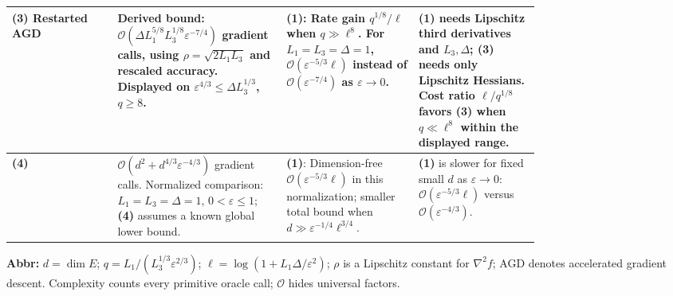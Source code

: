 \begin{table}[tp]
\begin{threeparttable}
\begin{tabularx}{\linewidth}{@{}>{\raggedright\arraybackslash}p{0.20\linewidth}>{\raggedright\arraybackslash}p{0.32\linewidth}>{\raggedright\arraybackslash}p{0.25\linewidth}>{\raggedright\arraybackslash}X@{}}
\midrule
\textbf{(3)} Restarted AGD \citep[Theorem 1]{gtoLiLin2023}
& Derived bound: $\mathcal{O}(\Delta L_1^{5/8}L_3^{1/8}\varepsilon^{-7/4})$ gradient calls, using $\rho=\sqrt{2L_1L_3}$ and rescaled accuracy. Displayed on $\varepsilon^{4/3}\leq\Delta L_3^{1/3}$, $q\geq8$.
& \textbf{(1)}: Rate gain $q^{1/8}/\ell$ when $q\gg\ell^8$. For $L_1=L_3=\Delta=1$, $\mathcal{O}(\varepsilon^{-5/3}\ell)$ instead of $\mathcal{O}(\varepsilon^{-7/4})$ as $\varepsilon\to0$.
& \textbf{(1)} needs Lipschitz third derivatives and $L_3,\Delta$; \textbf{(3)} needs only Lipschitz Hessians. Cost ratio $\ell/q^{1/8}$ favors \textbf{(3)} when $q\ll\ell^8$ within the displayed range. \\
\midrule
\textbf{(4)} \citep[Theorem 1.3; precise Theorem 5.2, $p=3$]{gtoZhou2026v1}
& $\mathcal{O}(d^2+d^{4/3}\varepsilon^{-4/3})$ gradient calls. Normalized comparison: $L_1=L_3=\Delta=1$, $0<\varepsilon\leq1$; \textbf{(4)} assumes a known global lower bound.
& \textbf{(1)}: Dimension-free $\mathcal{O}(\varepsilon^{-5/3}\ell)$ in this normalization; smaller total bound when $d\gg\varepsilon^{-1/4}\ell^{3/4}$.
& \textbf{(1)} is slower for fixed small $d$ as $\varepsilon\to0$: $\mathcal{O}(\varepsilon^{-5/3}\ell)$ versus $\mathcal{O}(\varepsilon^{-4/3})$. \\
\bottomrule
\end{tabularx}
\begin{tablenotes}[flushleft]\footnotesize
\item[] \textbf{Abbr:} $d=\dim E$; $q=L_1/(L_3^{1/3}\varepsilon^{2/3})$; $\ell=\log(1+L_1\Delta/\varepsilon^2)$; $\rho$ is a Lipschitz constant for $\nabla^2 f$; AGD denotes accelerated gradient descent. Complexity counts every primitive oracle call; $\mathcal{O}$ hides universal factors.
\end{tablenotes}
\end{threeparttable}
\end{table}
